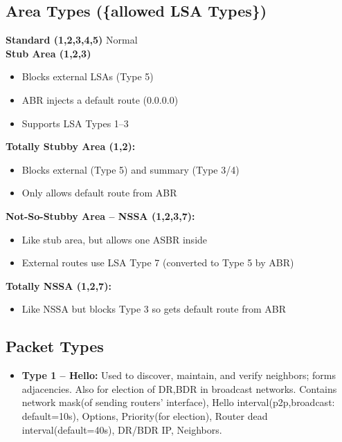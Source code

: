 \begin{multicols*}{5}
		\subsection{Area Types (\{allowed LSA Types\})}
		{\setlength\multicolsep{1pt}%
			\begin{multicols}{2}
				\textbf{Standard (1,2,3,4,5)} Normal \\
				\textbf{Stub Area (1,2,3)}
				\begin{itemize}
					\item Blocks external LSAs (Type 5)
					\item ABR injects a default route (0.0.0.0)
					\item Supports LSA Types 1–3
				\end{itemize}
				
				\textbf{Totally Stubby Area (1,2):}
				\begin{itemize}
					\item Blocks external (Type 5) and summary (Type 3/4)
					\item Only allows default route from ABR
				\end{itemize}
				
				\textbf{Not-So-Stubby Area – NSSA (1,2,3,7):}
				\begin{itemize}
					\item Like stub area, but allows one ASBR inside
					\item External routes use LSA Type 7 (converted to Type 5 by ABR)
				\end{itemize}
				
				\textbf{Totally NSSA (1,2,7):}
				\begin{itemize}
					\item Like NSSA but blocks Type 3 so gets default route from ABR
				\end{itemize}
			\end{multicols}
		}
		\subsection{Packet Types}
		\begin{itemize}
			\item \textbf{Type 1 – Hello:}  
			Used to discover, maintain, and verify neighbors; forms adjacencies. Also for election of DR,BDR in broadcast networks. Contains network mask(of sending routers' interface), Hello interval(p2p,broadcast: default=10s), Options, Priority(for election), Router dead interval(default=40s), DR/BDR IP, Neighbors.
			

\end{itemize}
\end{multicols*}
